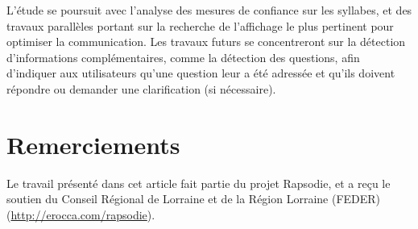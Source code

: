 \documentclass[10pt,a4paper,twoside]{article}
\begin{document}
L’étude se poursuit avec l'analyse des mesures de confiance sur les syllabes, et des travaux parallèles portant sur la recherche de l'affichage le plus pertinent pour optimiser la communication. Les travaux futurs se concentreront sur la détection d'informations complémentaires, comme la détection des questions, afin d’indiquer aux utilisateurs qu’une question leur a été adressée et qu’ils doivent répondre ou demander une clarification (si nécessaire).

\section*{Remerciements} 

Le travail présenté dans cet article fait partie du projet Rapsodie, et a reçu le soutien du Conseil Régional de Lorraine et de la Région Lorraine (FEDER) (\href{http://erocca.com/rapsodie}{\textsf{http://erocca.com/rapsodie}}).





\end{document}
